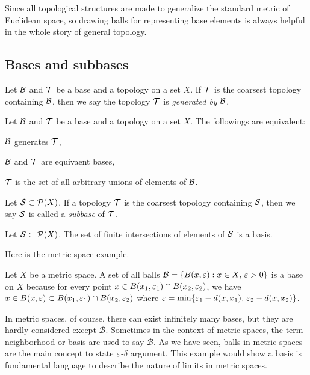 \documentclass{../crs}
\begin{document}
Since all topological structures are made to generalize the standard metric of Euclidean space, so drawing balls for representing base elements is always helpful in the whole story of general topology.






\subsection{Bases and subbases}

\begin{defn}
Let $\mathcal{B}$ and $\mathcal{T}$ be a base and a topology on a set $X$.
If $\mathcal{T}$ is the coarsest topology containing $\mathcal{B}$, then we say the topology $\mathcal{T}$ is \emph{generated by} $\mathcal{B}$.
\end{defn}
\begin{thm}
Let $\mathcal{B}$ and $\mathcal{T}$ be a base and a topology on a set $X$.
The followings are equivalent:
\begin{cond}
\item $\mathcal{B}$ generates $\mathcal{T}$,
\item $\mathcal{B}$ and $\mathcal{T}$ are equivaent bases,
\item $\mathcal{T}$ is the set of all arbitrary unions of elements of $\mathcal{B}$.
\end{cond}
\end{thm}

\begin{defn}
Let $\mathcal{S}\subset\mathcal{P}(X)$.
If a topology $\mathcal{T}$ is the coarsest topology containing $\mathcal{S}$, then we say $\mathcal{S}$ is called a \emph{subbase} of $\mathcal{T}$.
\end{defn}
\begin{prop}
Let $\mathcal{S}\subset\mathcal{P}(X)$.
The set of finite intersections of elements of $\mathcal{S}$ is a basis.
\end{prop}

Here is the metric space example.
\begin{ex}
Let $X$ be a metric space.
A set of all balls $\mathcal{B}=\{B(x,\varepsilon):x\in X,\,\varepsilon>0\}$ is a base on $X$ because for every point $x\in B(x_1,\varepsilon_1)\cap B(x_2,\varepsilon_2)$, we have $x\in B(x,\varepsilon)\subset B(x_1,\varepsilon_1)\cap B(x_2,\varepsilon_2)$ where $\varepsilon=\min\{\varepsilon_1-d(x,x_1),\,\varepsilon_2-d(x,x_2)\}$.
\end{ex}

In metric spaces, of course, there can exist infinitely many bases, but they are hardly considered except $\mathcal{B}$.
Sometimes in the context of metric spaces, the term neighborhood or basis are used to say $\mathcal{B}$.
As we have seen, balls in metric spaces are the main concept to state $\varepsilon$-$\delta$ argument.
This example would show a basis is fundamental language to describe the nature of limits in metric spaces.
\end{document}

